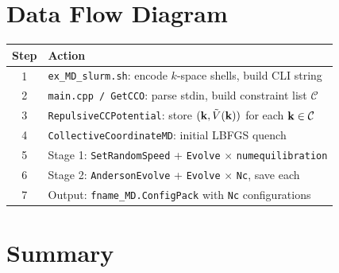 \documentclass[12pt,a4paper]{article}
\begin{document}
\section{Data Flow Diagram}

\begin{center}
\renewcommand{\arraystretch}{1.6}
\begin{tabular}{cl}
\toprule
Step & Action \\
\midrule
1 & \texttt{ex\_MD\_slurm.sh}: encode $k$-space shells, build CLI string \\
2 & \texttt{main.cpp / GetCCO}: parse stdin, build constraint list $\mathcal{C}$ \\
3 & \texttt{RepulsiveCCPotential}: store $({\bf k}, \tilde{V}({\bf k}))$ for each ${\bf k} \in \mathcal{C}$ \\
4 & \texttt{CollectiveCoordinateMD}: initial LBFGS quench \\
5 & Stage 1: \texttt{SetRandomSpeed} + \texttt{Evolve} $\times$ \texttt{numequilibration} \\
6 & Stage 2: \texttt{AndersonEvolve} + \texttt{Evolve} $\times$ \texttt{Nc}, save each \\
7 & Output: \texttt{fname\_MD.ConfigPack} with \texttt{Nc} configurations \\
\bottomrule
\end{tabular}
\end{center}

\section{Summary}
\end{document}
